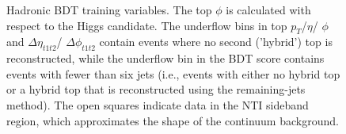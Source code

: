 \begin{figure}[htbp]
  \caption{Hadronic BDT training variables. The top $\phi$ is calculated with respect to the Higgs candidate. The underflow bins in top $p_{T}$/$\eta$/ $\phi$ and $\Delta\eta_{t1t2}$/ $\Delta\phi_{t1t2}$ contain events where no second ('hybrid') top is reconstructed, while the underflow bin in the BDT score contains events with fewer than six jets (i.e., events with either no hybrid top or a hybrid top that is reconstructed using the remaining-jets method). The open squares indicate data in the NTI sideband region, which approximates the shape of the continuum background. }
  \label{fig:hadvbls2}
\end{figure}

